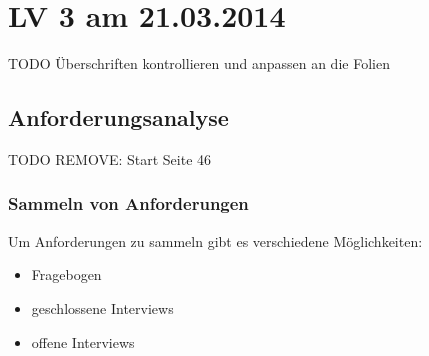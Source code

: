 \chapter{LV 3 am 21.03.2014}
TODO Überschriften kontrollieren und anpassen an die Folien
\section{Anforderungsanalyse}
TODO REMOVE: Start Seite 46
\subsection{Sammeln von Anforderungen}
Um Anforderungen zu sammeln gibt es verschiedene Möglichkeiten:
\begin{itemize}
\item Fragebogen
\item geschlossene Interviews
\item offene Interviews
\end{itemize}


